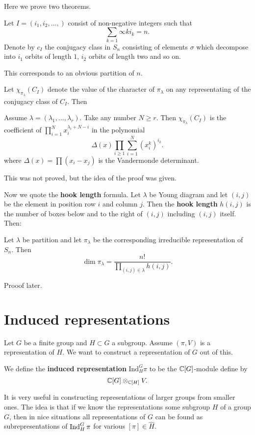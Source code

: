 \documentclass[11pt, english]{article}
\begin{document}
Here we prove two theorems. 

Let $I=(i_1,i_2,\ldots,)$ consist of non-negative integers such that
$$
\sum_{k=1}\infty ki_k=n.
$$
Denote by $c_I$ the conjugacy class in $S_n$ consisting of elements $\sigma$ which decompose into $i_1$ orbits of length $1$, $i_2$ orbits of length two and so on. 

This corresponds to an obvious partition of $n$.

Let $\chi_{\pi_\lambda}(C_I)$ denote the value of the character of $\pi_\lambda$ on any representating of the conjugacy class of $C_I$. Then
\begin{thm}
  
Assume $\lambda=(\lambda_1,\ldots,\lambda_r)$. Take any number $N \geq r$. Then $\chi_{\pi_\lambda}(C_I)$ is the coefficient of $\prod_{i=1}^N x_i^{\lambda_i+N-i}$ in the polynomial
$$
\Delta(x) \prod_{i \geq 1} \sum_{i=1}^N (x_i^k)^{i_k}.
$$
where $\Delta(x) = \prod (x_i-x_j)$ is the Vandermonde determinant.
\end{thm}

This was not proved, but the idea of the proof was given.

Now we quote the \textbf{hook length} formula. Let $\lambda$ be Young diagram and let $(i,j)$ be the element in position row $i$ and column $j$. Then the \textbf{hook length} $h(i,j)$ is the number of boxes below and to the right of $(i,j)$ including $(i,j)$ itself. Then:

\begin{thm}
  Let $\lambda$ be partition and let $\pi_\lambda$ be the corresponding irreducible representation of $S_n$. Then 
$$
\dim \pi_\lambda = \frac{n!}{\prod_{(i,j) \in \lambda} h(i,j)}.
$$
\end{thm}

Prooof later.


\section{Induced representations}

Let $G$ be a finite group and $H \subset G$ a subgroup. Assume $(\pi,V)$ is a representation of $H$. We want to construct a representation of $G$ out of this.

We define the \textbf{induced representation} $\mathrm{Ind}_H^G \pi$ to be the $\mathbb{C}[G]$-module define by
$$
\mathbb{C}[G] \otimes_{\mathbb{C}[H]} V.
$$

It is very useful in constructing representations of larger groups from smaller ones. The idea is that if we know the representations some subgroup $H$ of a group $G$, then in nice situations all representations of $G$ can be found as subrepresentations of $\operatorname{Ind}_H^G \pi$ for various $[\pi] \in \hat H$.
\end{document}
